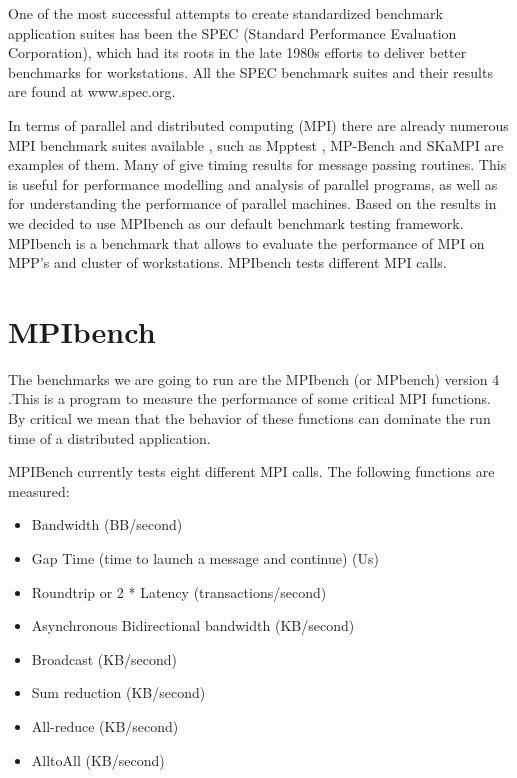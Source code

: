 One of the most successful attempts to create standardized benchmark
application suites has been the SPEC (Standard Performance Evaluation
Corporation), which had its roots in the late 1980s efforts to deliver better
benchmarks for workstations\cite{Hennessy}. All the SPEC benchmark suites and
their results are found at www.spec.org.

In terms of parallel and distributed computing (MPI) there are already numerous
MPI benchmark suites available , such as Mpptest \cite{Gropp}, MP-Bench
\cite{Calderon} and  SKaMPI \cite{Hoefler} are examples of them. Many of give
timing results for message passing routines. This is useful for performance
modelling and analysis of parallel programs, as well as for understanding the
performance of parallel machines. Based on the results in \cite{Grove} we
decided to use MPIbench as our default benchmark testing framework. MPIbench is
a benchmark that allows to evaluate the performance of MPI on MPP's and cluster
of workstations. MPIbench tests different MPI calls.

\section{MPIbench}
\noindent

The benchmarks we are going to run are the MPIbench (or MPbench) version 4
\cite{mpibench}.This is a program to measure the performance of some critical
MPI functions. By critical we mean that the behavior of these functions can
dominate the run time of a distributed application.

MPIBench currently tests eight different MPI calls. The following functions are
measured:

\begin{itemize}
    \item Bandwidth (BB/second)
    \item Gap Time (time to launch a message and continue) (Us)
    \item Roundtrip or 2 * Latency (transactions/second)
    \item Asynchronous Bidirectional bandwidth (KB/second)
    \item Broadcast (KB/second)
    \item Sum reduction (KB/second)
    \item All-reduce (KB/second)
    \item AlltoAll (KB/second)
\end{itemize}



